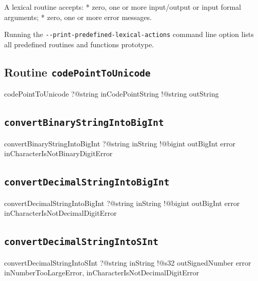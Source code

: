 A lexical routine accepts:
  * zero, one or more input/output or input formal arguments;
  * zero, one or more error messages.

Running the \texttt{-{}-print-predefined-lexical-actions} command line option lists all predefined routines and functions prototype.

\subsection{Routine \texttt{codePointToUnicode}}

\begin{galgas4}
codePointToUnicode ?@string inCodePointString
                   !@string outString
\end{galgas4}

\subsection{\texttt{convertBinaryStringIntoBigInt}}

\begin{galgas4}
convertBinaryStringIntoBigInt ?@string inString
                              !@bigint outBigInt
                              error inCharacterIsNotBinaryDigitError
\end{galgas4}


\subsection{\texttt{convertDecimalStringIntoBigInt}}

\begin{galgas4}
convertDecimalStringIntoBigInt ?@string inString
                               !@bigint outBigInt
                               error inCharacterIsNotDecimalDigitError
\end{galgas4}


\subsection{\texttt{convertDecimalStringIntoSInt}}

\begin{galgas4}
convertDecimalStringIntoSInt ?@string inString
                             !@s32 outSignedNumber
                             error inNumberTooLargeError,
                                   inCharacterIsNotDecimalDigitError
\end{galgas4}

